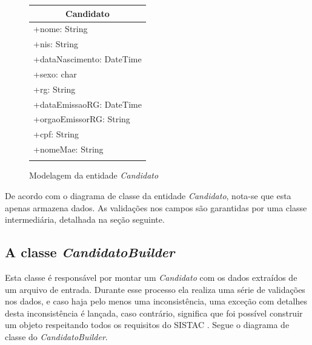 \documentclass[
	12pt,			%
	openright,		%
	oneside,	
	a4paper,		%
	english,		%
	brazil			%
]{abntex2/abntex2}  %
\begin{document}
	\begin{figure}[H]
		\begin{center}
			
			\caption{Modelagem da entidade \textit{Candidato}}
			\label{candidato-uml}
			
			\begin{tabular}{|l|}
				\hline
				\multicolumn{1}{|c|}{\textbf{Candidato}} \\ \hline
				+nome: String \\
				+nis: String \\
				+dataNascimento: DateTime \\
				+sexo: char \\
				+rg: String \\
				+dataEmissaoRG: DateTime \\
				+orgaoEmissorRG: String \\
				+cpf: String \\
				+nomeMae: String \\ \hline
				\\ \hline
			\end{tabular}
			
		\end{center}
	\end{figure}
	
	De acordo com o diagrama de classe da entidade \textit{Candidato}, nota-se que esta apenas armazena dados. As validações nos campos são garantidas por uma classe intermediária, detalhada na seção seguinte.
	
	\subsection{A classe \textit{CandidatoBuilder}}
	
	Esta classe é responsável por montar um \textit{Candidato} com os dados extraídos de um arquivo de entrada. Durante esse processo ela realiza uma série de validações nos dados, e caso haja pelo menos uma inconsistência, uma exceção com detalhes desta inconsistência é lançada, caso contrário, significa que foi possível construir um objeto respeitando todos os requisitos do SISTAC \cite{sistac-formatos}. Segue o diagrama de classe do \textit{CandidatoBuilder}.
	
\end{document}
